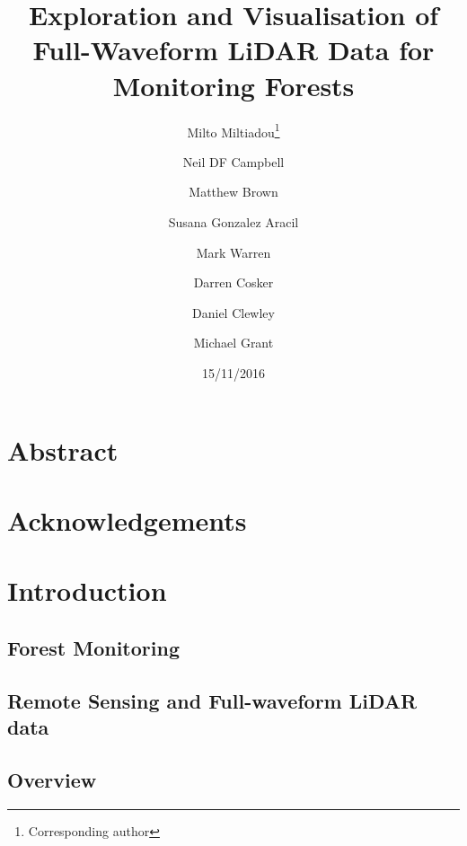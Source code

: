 \documentclass{article}
\begin{document}
\begin{titlepage}
	\title{\textbf{Exploration and Visualisation of Full-Waveform LiDAR Data for Monitoring Forests}}
	\date {15/11/2016}
	\author [1,2,3]{Milto Miltiadou\thanks{Corresponding author}}
	\author [1]{Neil DF Campbell}
	\author [1]{Matthew Brown}
	\author [3]{Susana Gonzalez Aracil}
	\author [2]{Mark Warren}
	\author [1]{Darren Cosker}
	\author [2]{ Daniel Clewley}
	\author [2]{Michael Grant}
	\renewcommand\Authands{and}
	\renewcommand{\floatpagefraction}{1}%


 \maketitle
  

\end{titlepage}

\newpage
	\setcounter{secnumdepth}{0}
	\section{Abstract}\label{Abstract}
		
		\newpage
	\section{Acknowledgements}\label{Acknowledgments}
		
		\newpage
    \tableofcontents	 
		\newpage  
	\setcounter{secnumdepth}{4}	
	\section{Introduction} \label{Introduction}
		\subsection{Forest Monitoring}
			
		\subsection{Remote Sensing and Full-waveform LiDAR data}
			
			\newpage
		
		\subsection{Overview} \label{Overview}
		
			
\end{document}
